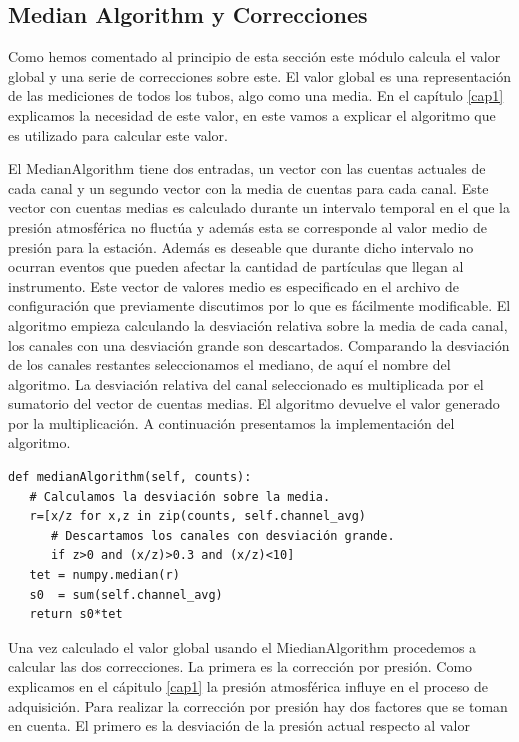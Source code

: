 	\subsection{Median Algorithm y Correcciones}
		Como hemos comentado al principio de esta sección este módulo calcula el valor global y una serie de correcciones sobre este. El valor
		global es una representación de las mediciones de todos los tubos, algo como una media. En el capítulo \ref{cap1} explicamos la
		necesidad de este valor, en este vamos a explicar el algoritmo que es utilizado para calcular este valor.
	  	\par 
		El MedianAlgorithm\cite{MedianAlgr} tiene dos entradas, un vector con las cuentas actuales de cada canal y un segundo vector con la
		media de cuentas para cada canal. Este vector con cuentas medias es calculado durante un intervalo temporal en el que la presión
		atmosférica no fluctúa y además esta se corresponde al valor medio de presión para la estación. Además es deseable que durante dicho
		intervalo no ocurran eventos que pueden afectar la cantidad de partículas que llegan al instrumento. Este vector de valores medio es
		especificado  en el archivo de configuración que previamente discutimos por lo que es fácilmente modificable. El algoritmo empieza
		calculando la desviación relativa sobre la media de cada canal, los canales con una desviación grande son descartados. Comparando la
		desviación de los canales restantes seleccionamos el mediano, de aquí el nombre del algoritmo. La desviación relativa del canal
		seleccionado es multiplicada por el sumatorio del vector de cuentas medias. El algoritmo devuelve el valor generado por la
		multiplicación. A continuación presentamos la implementación del algoritmo.
		\begin{lstlisting}[style=myPython]
def medianAlgorithm(self, counts):
   # Calculamos la desviación sobre la media.
   r=[x/z for x,z in zip(counts, self.channel_avg) 
      # Descartamos los canales con desviación grande.
      if z>0 and (x/z)>0.3 and (x/z)<10]
   tet = numpy.median(r)
   s0  = sum(self.channel_avg)
   return s0*tet
		\end{lstlisting}
		\par 
		Una vez calculado el valor global usando el MiedianAlgorithm procedemos a calcular las dos correcciones. La primera es la corrección
		por presión. Como explicamos en el cápitulo \ref{cap1} la presión atmosférica influye en el proceso de adquisición. Para realizar la
		corrección por presión hay dos factores que se toman en cuenta. El primero es la desviación de la presión actual respecto al valor
